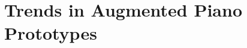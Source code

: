 \documentclass[sigchi, review]{acmart}
\begin{document}



\section{Trends in Augmented Piano Prototypes}

\end{document}
